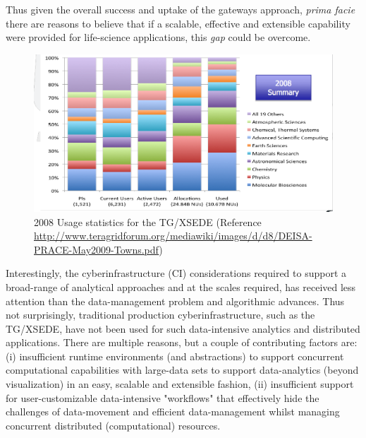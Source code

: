 \documentclass[]{svjour3}
\begin{document}
Thus given the overall success and uptake of the gateways approach,
{\it prima facie} there are reasons to believe that if a scalable,
effective and extensible capability were provided for life-science
applications, this {\it gap} could be overcome.




 

\begin{figure}
 \centering
\includegraphics[scale=0.27]{figures/teragrid-discipline08}
\caption{\small 2008 Usage statistics for the TG/XSEDE (Reference
  \url{http://www.teragridforum.org/mediawiki/images/d/d8/DEISA-PRACE-May2009-Towns.pdf})}
  \label{tg2008}
\end{figure}

Interestingly, the cyberinfrastructure (CI) considerations required to
support a broad-range of analytical approaches and at the scales
required, has received less attention than the data-management problem
and algorithmic advances. Thus not surprisingly, traditional
production cyberinfrastructure, such as the TG/XSEDE, have not been used for
such data-intensive analytics and distributed applications. There are
multiple reasons, but a couple of contributing factors are: (i)
insufficient runtime environments (and abstractions) to support
concurrent computational capabilities with large-data sets to support
data-analytics (beyond visualization) in an easy, scalable and
extensible fashion, (ii) insufficient support for user-customizable
data-intensive "workflows" that effectively hide the challenges of
data-movement and efficient data-management whilst managing concurrent
distributed (computational) resources.
\end{document}
